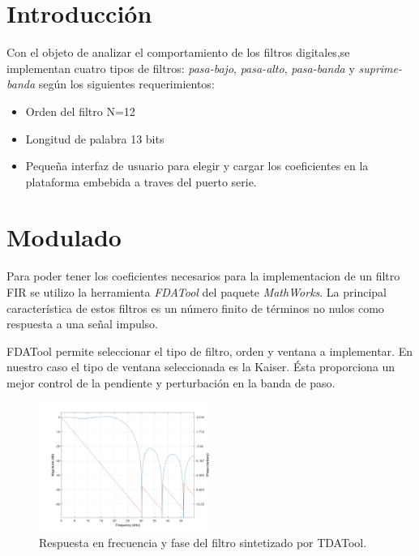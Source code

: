 \documentclass[conference]{IEEEtran}
\begin{document}
\section{Introducción}

Con el objeto de analizar el comportamiento de los filtros
digitales,se implementan  cuatro tipos de filtros: \emph{pasa-bajo},
\emph{pasa-alto}, \emph{pasa-banda} y \emph{suprime-banda} según los
siguientes requerimientos:

\begin{itemize}
\item  Orden del filtro N=12
\item Longitud de palabra 13 bits
\item Pequeña interfaz de usuario para elegir y cargar los coeficientes
  en la plataforma embebida a traves del puerto serie.
\end{itemize}

\section{Modulado}
\label{sec:mod}

Para poder tener los coeficientes necesarios para la implementacion de
un filtro FIR se utilizo la herramienta \emph{FDATool} del paquete
\emph{MathWorks}. La principal característica de estos filtros es un
número finito de términos no nulos como respuesta a una señal impulso.

FDATool permite seleccionar el tipo de filtro, orden y ventana a
implementar. En nuestro caso el tipo de ventana seleccionada es la
Kaiser. Ésta proporciona un mejor control de la pendiente y
perturbación en la banda de paso. 

\begin{figure}[!t]
\centering
  \includegraphics[width=0.5\textwidth]{images/fdatool-plot}
  \caption{Respuesta en frecuencia y fase del filtro sintetizado por TDATool.}
  \label{fig:res-fil}
\end{figure}
\end{document}
